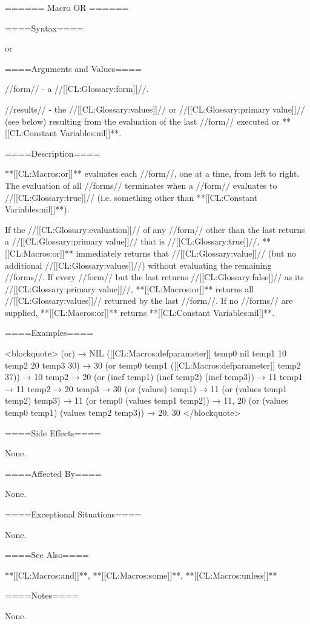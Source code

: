 ====== Macro OR ======

====Syntax====

\DefmacWithValues or {} {}

====Arguments and Values====

//form// - a //[[CL:Glossary:form]]//.

//results// - the //[[CL:Glossary:values]]// or //[[CL:Glossary:primary value]]// (see below) resulting from the evaluation of the last //form// executed or **[[CL:Constant Variables:nil]]**.

====Description====

**[[CL:Macros:or]]** evaluates each //form//, one at a time, from left to right. The evaluation of all //forms// terminates when a //form// evaluates to //[[CL:Glossary:true]]// (i.e. something other than **[[CL:Constant Variables:nil]]**).

If the //[[CL:Glossary:evaluation]]// of any //form// other than the last returns a //[[CL:Glossary:primary value]]// that is //[[CL:Glossary:true]]//, **[[CL:Macros:or]]** immediately returns that //[[CL:Glossary:value]]// (but no additional //[[CL:Glossary:values]]//) without evaluating the remaining //forms//. If every //form// but the last returns //[[CL:Glossary:false]]// as its //[[CL:Glossary:primary value]]//, **[[CL:Macros:or]]** returns all //[[CL:Glossary:values]]// returned by the last //form//. If no //forms// are supplied, **[[CL:Macros:or]]** returns **[[CL:Constant Variables:nil]]**.

====Examples====

<blockquote> (or) → NIL ([[CL:Macros:defparameter]] temp0 nil temp1 10 temp2 20 temp3 30) → 30 (or temp0 temp1 ([[CL:Macros:defparameter]] temp2 37)) → 10 temp2 → 20 (or (incf temp1) (incf temp2) (incf temp3)) → 11 temp1 → 11 temp2 → 20 temp3 → 30 (or (values) temp1) → 11 (or (values temp1 temp2) temp3) → 11 (or temp0 (values temp1 temp2)) → 11, 20 (or (values temp0 temp1) (values temp2 temp3)) → 20, 30 </blockquote>

====Side Effects====

None.

====Affected By====

None.

====Exceptional Situations====

None.

====See Also====

**[[CL:Macros:and]]**, **[[CL:Macros:some]]**, **[[CL:Macros:unless]]**

====Notes====

None.

